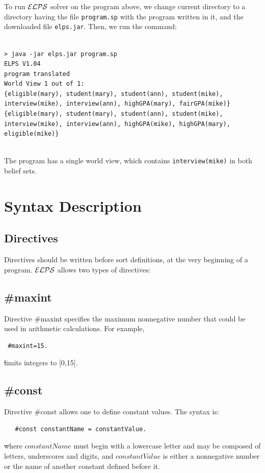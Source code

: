 \documentclass[12pt, letterpaper]{article}
\begin{document}
To run  ${\cal ELPS}$ solver  on the program above, 
we change current directory to a directory having the file \texttt{program.sp} with the program written in it, and the downloaded file \texttt{elps.jar}.  Then, we run the command:
\begin{verbatim}

> java -jar elps.jar program.sp
ELPS V1.04
program translated
World View 1 out of 1:
{eligible(mary), student(mary), student(ann), student(mike), 
interview(mike), interview(ann), highGPA(mary), fairGPA(mike)}
{eligible(mary), student(mary), student(ann), student(mike), 
interview(mike), interview(ann), highGPA(mike), highGPA(mary), 
eligible(mike)}


\end{verbatim}
The program has a single world view, which contains \texttt{interview(mike)} in both belief sets.




\section{Syntax Description}

\subsection{Directives}
Directives should be written before sort definitions, at the very beginning of a program.
${\cal ELPS}$ allows two types of directives:
\subsection*{\#maxint}
Directive \#maxint specifies the maximum nonnegative number that could be used in arithmetic calculations.
For example,
\begin{verbatim}
 #maxint=15.
\end{verbatim}
\st limits integers to [0,15].
\subsection*{\#const}
Directive \#const allows one to define constant values. The syntax is:

\begin{verbatim}
   #const constantName = constantValue.
\end{verbatim}      
\st where $constantName$  must begin with a lowercase letter and may be composed of letters, underscores and digits,
 and $constantValue$ is either a nonnegative number or the name of another constant defined before it.  
\end{document}
